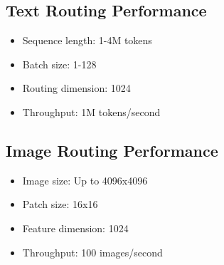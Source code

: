 \documentclass[10pt]{article}
\begin{document}
\subsection{Text Routing Performance}
\begin{itemize}
    \item Sequence length: 1-4M tokens
    \item Batch size: 1-128
    \item Routing dimension: 1024
    \item Throughput: 1M tokens/second
\end{itemize}

\subsection{Image Routing Performance}
\begin{itemize}
    \item Image size: Up to 4096x4096
    \item Patch size: 16x16
    \item Feature dimension: 1024
    \item Throughput: 100 images/second
\end{itemize}
\end{document}
